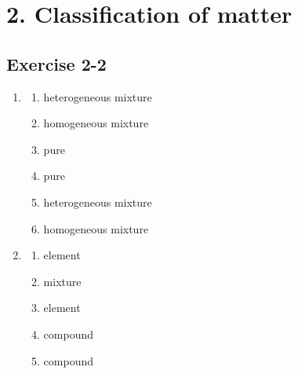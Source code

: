 \section {2. Classification of matter}

\subsection{Exercise 2-2} 
\begin{multicols}{3}
\begin{enumerate}[itemsep=5pt, label=\textbf{\arabic*}. ] 
\item %
  \begin{enumerate}
   \item heterogeneous mixture
   \item homogeneous mixture
   \item pure
   \item pure
   \item heterogeneous mixture
   \item homogeneous mixture
  \end{enumerate}
\item %
  \begin{enumerate}
   \item element
   \item mixture
   \item element
   \item compound
   \item compound
  \end{enumerate}         
\end{enumerate}
\end{multicols}

